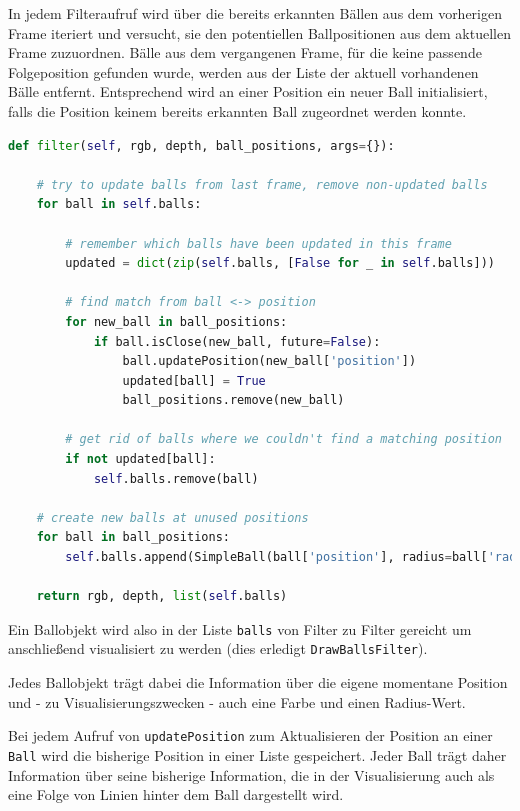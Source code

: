 \documentclass[12pt,a4paper,ngerman]{scrartcl}
\begin{document}
In jedem Filteraufruf wird über die bereits erkannten Bällen aus dem vorherigen Frame iteriert und versucht, sie den potentiellen Ballpositionen aus dem aktuellen Frame zuzuordnen.
Bälle aus dem vergangenen Frame, für die keine passende Folgeposition gefunden wurde, werden aus der Liste der aktuell vorhandenen Bälle entfernt.
Entsprechend wird an einer Position ein
neuer Ball initialisiert, falls die Position keinem bereits erkannten Ball zugeordnet werden konnte.

\begin{lstlisting}[language=Python,caption={\lstinline{SimpleHandBall.py}, Ausschnitt}]
def filter(self, rgb, depth, ball_positions, args={}):

    # try to update balls from last frame, remove non-updated balls
    for ball in self.balls:

        # remember which balls have been updated in this frame
        updated = dict(zip(self.balls, [False for _ in self.balls]))

        # find match from ball <-> position
        for new_ball in ball_positions:
            if ball.isClose(new_ball, future=False):
                ball.updatePosition(new_ball['position'])
                updated[ball] = True
                ball_positions.remove(new_ball)

        # get rid of balls where we couldn't find a matching position
        if not updated[ball]:
            self.balls.remove(ball)

    # create new balls at unused positions
    for ball in ball_positions:
        self.balls.append(SimpleBall(ball['position'], radius=ball['radius']))

    return rgb, depth, list(self.balls)
\end{lstlisting}


Ein Ballobjekt wird also in der Liste \lstinline{balls} von Filter zu Filter 
gereicht um anschließend visualisiert zu werden (dies erledigt \lstinline{DrawBallsFilter}). 

Jedes Ballobjekt trägt dabei die Information über die eigene momentane Position und
- zu Visualisierungszwecken - auch eine Farbe und einen Radius-Wert. 

Bei jedem Aufruf von \lstinline{updatePosition} zum Aktualisieren der Position
an einer \lstinline{Ball} wird die bisherige Position in einer Liste gespeichert.
Jeder Ball trägt daher Information über seine bisherige Information, die in 
der Visualisierung auch als eine Folge von Linien hinter dem Ball dargestellt wird.
\end{document}
